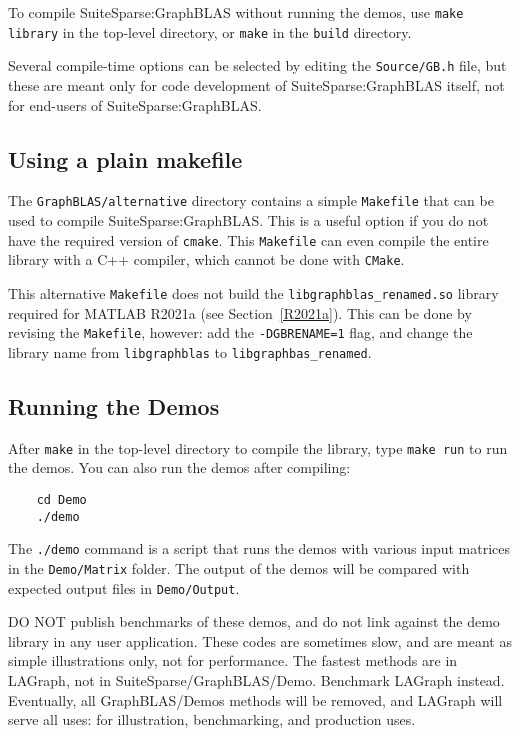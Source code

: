 \documentclass[12pt]{article}
\begin{document}
To compile SuiteSparse:GraphBLAS without running the demos, use \newline
\verb'make library' in the top-level directory, or \verb'make' in the
\verb'build' directory.

Several compile-time options can be selected by editing the \verb'Source/GB.h'
file, but these are meant only for code development of SuiteSparse:GraphBLAS
itself, not for end-users of SuiteSparse:GraphBLAS.

\subsection{Using a plain makefile}
\label{altmake}

The \verb'GraphBLAS/alternative' directory contains a simple \verb'Makefile'
that can be used to compile SuiteSparse:GraphBLAS.  This is a useful option
if you do not have the required version of \verb'cmake'.  This \verb'Makefile'
can even compile the entire library with a C++ compiler, which cannot be
done with \verb'CMake'.

This alternative \verb'Makefile' does not build the
\verb'libgraphblas_renamed.so' library required for MATLAB R2021a (see
Section~\ref{R2021a}).  This can be done by revising the \verb'Makefile',
however:  add the \verb'-DGBRENAME=1' flag, and change the library name
from \verb'libgraphblas' to \verb'libgraphbas_renamed'.

\subsection{Running the Demos}

After \verb'make' in the top-level directory to compile the library, type
\verb'make run' to run the demos.  You can also run the demos after compiling:

    {\small
    \begin{verbatim}
    cd Demo
    ./demo \end{verbatim} }

The \verb'./demo' command is a script that runs the demos with various input
matrices in the \verb'Demo/Matrix' folder.  The output of the demos will be
compared with expected output files in \verb'Demo/Output'.

\begin{alert}
DO NOT publish benchmarks of these demos, and do not link against the
demo library in any user application.  These codes are sometimes slow,
and are meant as simple illustrations only, not for performance.  The fastest
methods are in LAGraph, not in SuiteSparse/GraphBLAS/Demo.  Benchmark LAGraph
instead.  Eventually, all GraphBLAS/Demos methods will be removed, and LAGraph
will serve all uses: for illustration, benchmarking, and production uses.
\end{alert}
\end{document}
